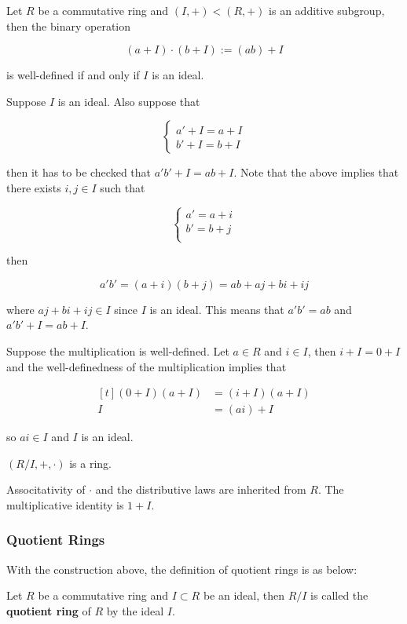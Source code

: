 \documentclass[a4paper,12pt]{article}
\begin{document}
\begin{thm}
  Let $R$ be a commutative ring and $(I,+)<(R,+)$ is an additive subgroup, then the binary operation

  $$(a+I)\cdot(b+I):=(ab)+I$$\s

  is well-defined if and only if $I$ is an ideal.\n

  \prf\arl Suppose $I$ is an ideal. Also suppose that

  $$\begin{cases}
    a'+I=a+I\\
    b'+I=b+I
  \end{cases}$$\s

  then it has to be checked that $a'b'+I=ab+I$. Note that the above implies that there exists $i,j\in I$ such that

  $$\begin{cases}
    a'=a+i\\
    b'=b+j\\
  \end{cases}$$\s

  then

  $$a'b'=(a+i)(b+j)=ab+aj+bi+ij$$\s

  where $aj+bi+ij\in I$ since $I$ is an ideal. This means that $a'b'=ab$ and $a'b'+I=ab+I$.\n

  \arr Suppose the multiplication is well-defined. Let $a\in R$ and $i\in I$, then $i+I=0+I$ and the well-definedness of the multiplication implies that

  $$\begin{aligned}[t]
    (0+I)(a+I)&=(i+I)(a+I)\\
    I&=(ai)+I
  \end{aligned}$$\s

  so $ai\in I$ and $I$ is an ideal.
\end{thm}\n

\begin{crl}
  $(R/I,+,\cdot)$ is a ring.\n

  \prf Associtativity of $\cdot$ and the distributive laws are inherited from $R$. The multiplicative identity is $1+I$.
\end{crl}

\subsubsection{Quotient Rings}
With the construction above, the definition of quotient rings is as below:\n

\begin{dft}
  Let $R$ be a commutative ring and $I\subset R$ be an ideal, then $R/I$ is called the \textbf{quotient ring} of $R$ by the ideal $I$.
\end{dft}\n
\end{document}
